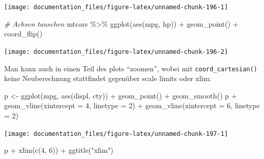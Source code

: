 \documentclass[
]{article}
\newenvironment{Shaded}{\begin{snugshade}}{\end{snugshade}}
\newcommand{\AttributeTok}[1]{\textcolor[rgb]{0.77,0.63,0.00}{#1}}
\newcommand{\CommentTok}[1]{\textcolor[rgb]{0.56,0.35,0.01}{\textit{#1}}}
\newcommand{\DecValTok}[1]{\textcolor[rgb]{0.00,0.00,0.81}{#1}}
\newcommand{\FunctionTok}[1]{\textcolor[rgb]{0.00,0.00,0.00}{#1}}
\newcommand{\NormalTok}[1]{#1}
\newcommand{\OtherTok}[1]{\textcolor[rgb]{0.56,0.35,0.01}{#1}}
\newcommand{\SpecialCharTok}[1]{\textcolor[rgb]{0.00,0.00,0.00}{#1}}
\newcommand{\StringTok}[1]{\textcolor[rgb]{0.31,0.60,0.02}{#1}}
\begin{document}
\begin{center}\texttt{[image: documentation\_files/figure-latex/unnamed-chunk-196-1]} \end{center}

\begin{Shaded}
\begin{Highlighting}[]
\CommentTok{\# Achsen tauschen}
\NormalTok{mtcars }\SpecialCharTok{\%\textgreater{}\%}
  \FunctionTok{ggplot}\NormalTok{(}\FunctionTok{aes}\NormalTok{(mpg, hp)) }\SpecialCharTok{+}
  \FunctionTok{geom\_point}\NormalTok{() }\SpecialCharTok{+}
  \FunctionTok{coord\_flip}\NormalTok{()}
\end{Highlighting}
\end{Shaded}

\begin{center}\texttt{[image: documentation\_files/figure-latex/unnamed-chunk-196-2]} \end{center}

Man kann auch in einen Teil des plots ``zoomen'', wobei mit \texttt{coord\_cartesian()} keine Neuberechnung stattfindet gegenüber scale limits oder xlim:

\begin{Shaded}
\begin{Highlighting}[]
\NormalTok{p }\OtherTok{\textless{}{-}} \FunctionTok{ggplot}\NormalTok{(mpg, }\FunctionTok{aes}\NormalTok{(displ, cty)) }\SpecialCharTok{+} \FunctionTok{geom\_point}\NormalTok{() }\SpecialCharTok{+} \FunctionTok{geom\_smooth}\NormalTok{()}
\NormalTok{p }\SpecialCharTok{+} \FunctionTok{geom\_vline}\NormalTok{(}\AttributeTok{xintercept =} \DecValTok{4}\NormalTok{, }\AttributeTok{linetype =} \DecValTok{2}\NormalTok{) }\SpecialCharTok{+} \FunctionTok{geom\_vline}\NormalTok{(}\AttributeTok{xintercept =} \DecValTok{6}\NormalTok{, }\AttributeTok{linetype =} \DecValTok{2}\NormalTok{)}
\end{Highlighting}
\end{Shaded}

\begin{center}\texttt{[image: documentation\_files/figure-latex/unnamed-chunk-197-1]} \end{center}

\begin{Shaded}
\begin{Highlighting}[]
\NormalTok{p }\SpecialCharTok{+} \FunctionTok{xlim}\NormalTok{(}\FunctionTok{c}\NormalTok{(}\DecValTok{4}\NormalTok{, }\DecValTok{6}\NormalTok{)) }\SpecialCharTok{+} \FunctionTok{ggtitle}\NormalTok{(}\StringTok{"xlim"}\NormalTok{)}
\end{Highlighting}
\end{Shaded}
\end{document}
